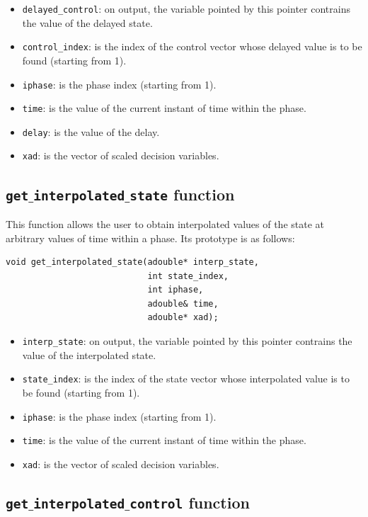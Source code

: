 \documentclass[a4paper,11pt]{report}    %
\begin{document}
\begin{itemize}
 \item \verb|delayed_control|: on output, the variable pointed by this pointer contrains the value of the delayed state.
 \item \verb|control_index|:    is the index of the control vector whose delayed value is to be found (starting from 1).
 \item \verb|iphase|:  is the phase index (starting from 1).
 \item \verb|time|:  is the value of the current instant of time within the phase.
 \item \verb|delay|:  is the value of the delay.
 \item \verb|xad|: is the vector of scaled decision variables.
\end{itemize}


\subsection{ \texttt{get$\_$interpolated$\_$state} function}

This function allows the user to obtain interpolated values of the state
at arbitrary values of time within a phase. Its prototype is as follows:

\begin{verbatim}
void get_interpolated_state(adouble* interp_state, 
                            int state_index, 
                            int iphase, 
                            adouble& time, 
                            adouble* xad);
\end{verbatim}

\begin{itemize}
 \item \verb|interp_state|: on output, the variable pointed by this pointer contrains the value of the interpolated state.
 \item \verb|state_index|:    is the index of the state vector whose interpolated value is to be found (starting from 1).
 \item \verb|iphase|:  is the phase index (starting from 1).
 \item \verb|time|:  is the value of the current instant of time within the phase.
 \item \verb|xad|: is the vector of scaled decision variables.
\end{itemize}


\subsection{ \texttt{get$\_$interpolated$\_$control} function}
\end{document}
